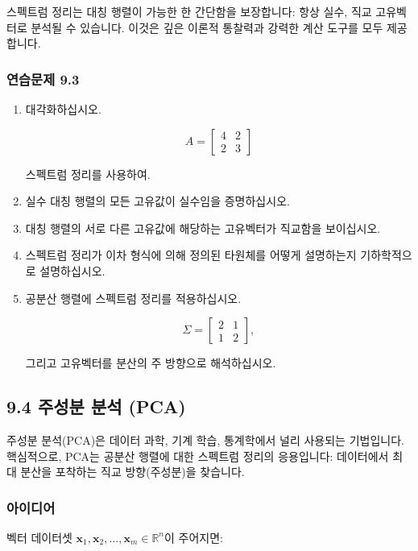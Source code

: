 \documentclass[
  12pt,
  a4paper,
]{article}
\begin{document}
스펙트럼 정리는 대칭 행렬이 가능한 한 간단함을 보장합니다: 항상 실수, 직교 고유벡터로 분석될 수 있습니다. 이것은 깊은 이론적 통찰력과 강력한 계산 도구를 모두 제공합니다.

\subsubsection{연습문제 9.3}\label{exercises-93}

\begin{enumerate}
\def\labelenumi{\arabic{enumi}.}
\item
  대각화하십시오.

  \[A = \begin{bmatrix} 4 & 2 \\ 2 & 3 \end{bmatrix}\]

  스펙트럼 정리를 사용하여.
\item
  실수 대칭 행렬의 모든 고유값이 실수임을 증명하십시오.
\item
  대칭 행렬의 서로 다른 고유값에 해당하는 고유벡터가 직교함을 보이십시오.
\item
  스펙트럼 정리가 이차 형식에 의해 정의된 타원체를 어떻게 설명하는지 기하학적으로 설명하십시오.
\item
  공분산 행렬에 스펙트럼 정리를 적용하십시오.

  \[\Sigma = \begin{bmatrix} 2 & 1 \\ 1 & 2 \end{bmatrix},\]

  그리고 고유벡터를 분산의 주 방향으로 해석하십시오.
\end{enumerate}

\subsection{9.4 주성분 분석 (PCA)}\label{94-principal-component-analysis-pca}

주성분 분석(PCA)은 데이터 과학, 기계 학습, 통계학에서 널리 사용되는 기법입니다. 핵심적으로, PCA는 공분산 행렬에 대한 스펙트럼 정리의 응용입니다: 데이터에서 최대 분산을 포착하는 직교 방향(주성분)을 찾습니다.

\subsubsection{아이디어}\label{the-idea-2}

벡터 데이터셋 \(\mathbf{x}_1, \mathbf{x}_2, \dots, \mathbf{x}_m \in \mathbb{R}^n\)이 주어지면:
\end{document}
